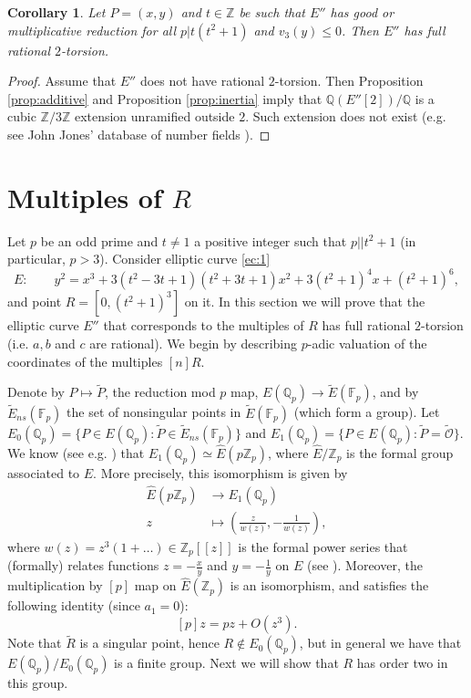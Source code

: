 \documentclass[11pt]{amsart}
\theoremstyle{plain}
\newtheorem{corollary}{Corollary}
\theoremstyle{remark}
\begin{document}
\begin{corollary}
\label{cor:conclusion}
Let $P=(x,y)$ and $t \in \mathbb{Z}$ be such that $E''$ has good or multiplicative reduction for all $p|t(t^2+1)$ and $v_3(y)\le 0$. Then $E''$ has full rational $2$-torsion.
\end{corollary}

\begin{proof}
Assume that $E''$ does not have rational $2$-torsion. Then Proposition \ref{prop:additive} and Proposition \ref{prop:inertia} imply that $\mathbb{Q}(E''[2])/\mathbb{Q}$ is a cubic $\mathbb{Z}/3\mathbb{Z}$ extension unramified outside $2$. Such extension does not exist (e.g. see John Jones' database of number fields \cite{J-R}).
\end{proof}

\section{Multiples of $R$}
\label{sec5}
\noindent Let $p$ be an odd prime and $t \ne 1$ a positive integer such that $p|| t^2+1$ (in particular, $p>3$). Consider elliptic curve \eqref{ec:1}
$$
E:\qquad y^2=x^3+3(t^2-3t+1)(t^2+3t+1)x^2+3(t^2+1)^4x+(t^2+1)^6,
$$
and point $R=[0,(t^2+1)^3]$ on it. In this section we will prove that the elliptic curve $E''$ that corresponds to the multiples of $R$ has full rational $2$-torsion (i.e. $a,b$ and $c$ are rational). We begin by describing $p$-adic valuation of the coordinates of the multiples $[n]R$.

Denote by $P \mapsto \tilde{P}$, the reduction mod $p$ map, $E(\mathbb{Q}_p) \rightarrow \tilde{E}(\mathbb{F}_p)$, and by $\tilde{E}_{ns}(\mathbb{F}_p)$ the set of nonsingular points in $\tilde{E}(\mathbb{F}_p)$ (which form a group). Let  $E_0(\mathbb{Q}_p)=\{P\in E(\mathbb{Q}_p): \tilde{P} \in \tilde{E}_{ns}(\mathbb{F}_p) \}$ and $E_1(\mathbb{Q}_p)=\{P \in E(\mathbb{Q}_p): \tilde{P} = \tilde{\mathcal{O}}\}$. We know (see e.g. \cite[Chapter 7]{Sil}) that $E_1(\mathbb{Q}_p) \simeq \widehat{E}(p\mathbb{Z}_p)$, where $\widehat{E}/\mathbb{Z}_p$ is the formal group associated to $E$. More precisely, this isomorphism is given by
\begin{align*}
\widehat{E}(p\mathbb{Z}_p) &\rightarrow E_1(\mathbb{Q}_p)\\
z &\mapsto \left(\frac{z}{w(z)}, -\frac{1}{w(z)}\right),
\end{align*}
where $w(z)=z^3(1+\ldots)\in \mathbb{Z}_p[[z]]$ is the formal power series that (formally) relates functions $z=-\frac{x}{y}$ and $y=-\frac{1}{y}$ on $E$ (see \cite[Chapter 4]{Sil}). Moreover, the multiplication by $[p]$ map on $\widehat{E}(\mathbb{Z}_p)$ is an isomorphism, and satisfies the following identity (since $a_1=0$):
$$
[p]z=pz+O(z^3).
$$
Note that $\tilde{R}$ is a singular point, hence $R\not \in E_0(\mathbb{Q}_p)$, but in general we have that $E(\mathbb{Q}_p)/E_0(\mathbb{Q}_p)$ is a finite group. Next we will show that $R$ has order two in this group.
\end{document}
